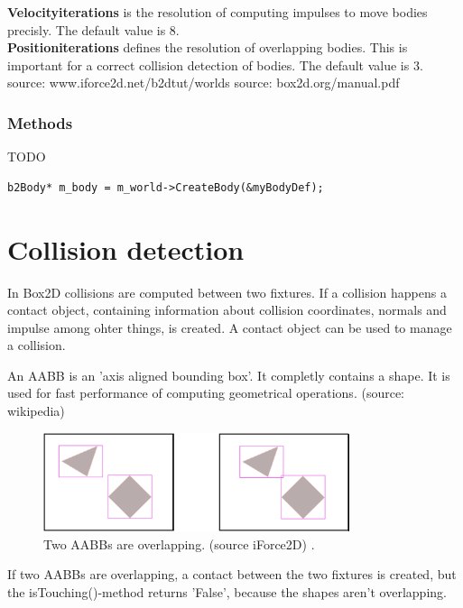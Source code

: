 \documentclass[10pt,a4paper,DIV=11]{scrreprt}
\begin{document}
\textbf{Velocityiterations} is the resolution of computing impulses to move bodies precisly. The default value is 8. \\

\textbf{Positioniterations} defines the resolution of overlapping bodies. This is important for a correct collision detection of bodies. The default value is 3. \\


source: www.iforce2d.net/b2dtut/worlds
source: box2d.org/manual.pdf

\subsubsection*{Methods}
TODO
\begin{lstlisting}[caption={World creates a body},label=lst:world-body]
b2Body* m_body = m_world->CreateBody(&myBodyDef);
\end{lstlisting}

\section{Collision detection}
In Box2D collisions are computed between two fixtures. If a collision happens a contact object, containing information about collision coordinates, normals and impulse among ohter things, is created. A contact object can be used to manage a collision.

An AABB is an 'axis aligned bounding box'. It completly contains a shape. It is used for fast performance of computing geometrical operations. (source: wikipedia)

\begin{center}
	\begin{figure}[H]
		\centering
		\includegraphics[width=0.8\textwidth,scale=1.0]{files/aabbs-crossing.png}  
		\caption{Two AABBs are overlapping. (source iForce2D) \cite{box2d-iforce}.}
		\label{fig:aabbs}
	\end{figure}
\end{center}
If two AABBs are overlapping, a contact between the two fixtures is created, but the isTouching()-method returns 'False', because the shapes aren't overlapping.
\end{document}
